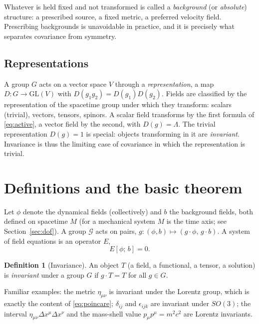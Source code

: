 \documentclass[11pt,a4paper,openany]{book}
\theoremstyle{definition}
\newtheorem{definition}{Definition}[chapter]
\theoremstyle{plain}
\theoremstyle{remark}
\begin{document}
Whatever is held fixed and not transformed is called a \emph{background} (or
\emph{absolute}) structure: a prescribed source, a fixed metric, a preferred
velocity field. Prescribing backgrounds is unavoidable in practice, and it is
precisely what separates covariance from symmetry.

\subsection{Representations}

A group $G$ acts on a vector space $V$ through a \emph{representation},
a map $D\colon G\to \mathrm{GL}(V)$ with $D(g_1g_2)=D(g_1)D(g_2)$.
Fields are classified by the representation of the spacetime group under
which they transform: scalars (trivial), vectors, tensors, spinors. A scalar
field transforms by the first formula of \eqref{eq:active}, a vector field by
the second, with $D(g)=\Lambda$. The trivial representation $D(g)=1$ is
special: objects transforming in it are \emph{invariant}. Invariance is thus
the limiting case of covariance in which the representation is trivial.

\section{Definitions and the basic theorem}
\label{sec:definitions}

Let $\phi$ denote the dynamical fields (collectively) and $b$ the background
fields, both defined on spacetime $M$ (for a mechanical system $M$ is the time axis;
see Section~\ref{sec:dof}). A group $\mathcal G$ acts on pairs,
$g\colon(\phi,b)\mapsto(g\cdot\phi,\,g\cdot b)$. A system of field equations
is an operator $E$,
\begin{equation}\label{eq:EOM}
  E[\phi;\,b]=0 .
\end{equation}

\begin{definition}[Invariance]\label{def:invariance}
An object $T$ (a field, a functional, a tensor, a solution) is
\emph{invariant} under a group $G$ if $g\cdot T=T$ for all $g\in G$.
\end{definition}

Familiar examples: the metric $\eta_{\mu\nu}$ is invariant under the
Lorentz group, which is exactly the content of \eqref{eq:poincare}; $\delta_{ij}$
and $\epsilon_{ijk}$ are invariant under $SO(3)$; the interval
$\eta_{\mu\nu}\Delta x^\mu\Delta x^\nu$ and the mass-shell value
$p_\mu p^\mu=m^2c^2$ are Lorentz invariants.
\end{document}
